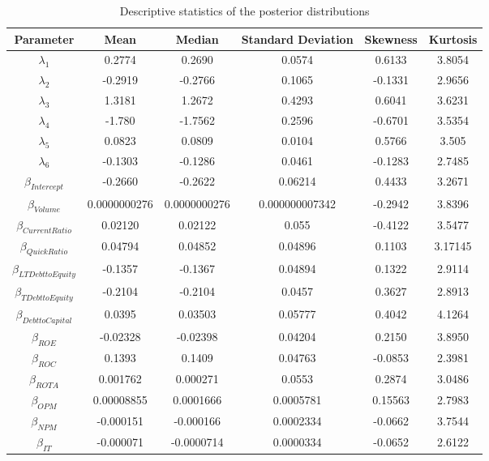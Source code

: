 \documentclass[times, doublespace]{auth}
\begin{document}
\begin{table}
	\small
	\centering
	\caption{Descriptive statistics of the posterior distributions}
	\label{table4}
	\begin{tabular}{|c|c|c|c|c|c|}
		\hline
		Parameter & Mean & Median & Standard Deviation & Skewness & Kurtosis\\
		\hline
		$\lambda_{1}$ & 0.2774 & 0.2690 & 0.0574 & 0.6133 & 3.8054\\
		\hline
		$\lambda_{2}$ & -0.2919 & -0.2766 & 0.1065 & -0.1331 & 2.9656\\
		\hline
		$\lambda_{3}$ & 1.3181 & 1.2672 & 0.4293 & 0.6041 & 3.6231\\
		\hline
		$\lambda_{4}$ & -1.780 & -1.7562 & 0.2596 & -0.6701 & 3.5354\\
		\hline
		$\lambda_{5}$ & 0.0823 & 0.0809 & 0.0104 & 0.5766 & 3.505\\
		\hline
		$\lambda_{6}$ & -0.1303 & -0.1286 & 0.0461 & -0.1283 & 2.7485\\
		\hline
		$\beta_{Intercept}$ & -0.2660 & -0.2622 & 0.06214 & 0.4433 & 3.2671\\
		\hline
		$\beta_{Volume}$ & 0.0000000276 & 0.0000000276 & 0.000000007342 & -0.2942 & 3.8396\\
		\hline
		$\beta_{Current Ratio}$ & 0.02120 & 0.02122 & 0.055 & -0.4122 & 3.5477\\
		\hline
		$\beta_{Quick Ratio}$ & 0.04794 & 0.04852 & 0.04896 & 0.1103 & 3.17145\\
		\hline
		$\beta_{LTDebt to Equity}$ & -0.1357 & -0.1367 & 0.04894 & 0.1322 & 2.9114\\
		\hline
		$\beta_{TDebt to Equity}$ & -0.2104 & -0.2104 & 0.0457 & 0.3627 & 2.8913\\
		\hline
		$\beta_{Debt to Capital}$ & 0.0395 & 0.03503 & 0.05777 & 0.4042 & 4.1264\\
		\hline
		$\beta_{ROE}$ & -0.02328 & -0.02398 & 0.04204 & 0.2150 & 3.8950\\
		\hline
		$\beta_{ROC}$ & 0.1393 & 0.1409 & 0.04763 & -0.0853 & 2.3981\\
		\hline
		$\beta_{ROTA}$ & 0.001762 & 0.000271 & 0.0553 & 0.2874 & 3.0486\\
		\hline
		$\beta_{OPM}$ & 0.00008855 & 0.0001666 & 0.0005781 & 0.15563 & 2.7983\\
		\hline
		$\beta_{NPM}$ & -0.000151 & -0.000166 & 0.0002334 & -0.0662 & 3.7544\\
		\hline
		$\beta_{IT}$ & -0.000071 & -0.0000714 & 0.0000334 & -0.0652 & 2.6122\\

\end{tabular}
\end{table}
\end{document}
